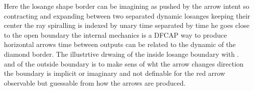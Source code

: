 \documentclass{article}
\begin{document}

Here the losange shape border can be imagining as pushed by the arrow intent so contracting and expanding between two separated dynamic losanges keeping their center the ray spiralling is indexed by unary time separated by time he goes close to the open boundary  the internal mechanics is  a DFCAP way to produce horizontal arrows time between outputs can be related to the dynamic of the diamond border.
The illustrtive drwaing of the inside losange boundary with . and of the outside boundary is to make sens of wht the arrow changes direction the boundary is implicit or imaginary and not definable for the red arrow observable but guessable from how the arrows are produced. 
\end{document}
